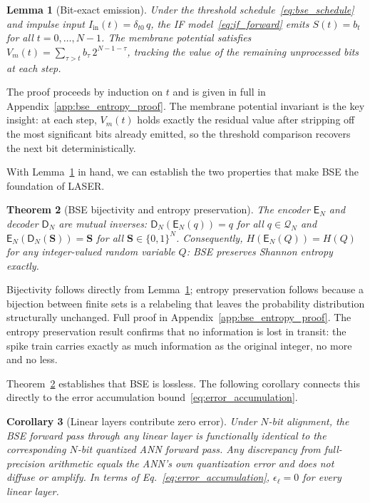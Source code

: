 \documentclass{article}
\theoremstyle{plain}
\newtheorem{theorem}{Theorem}[section]
\newtheorem{lemma}[theorem]{Lemma}
\newtheorem{corollary}[theorem]{Corollary}
\theoremstyle{definition}
\theoremstyle{remark}
\begin{document}
\begin{lemma}[Bit-exact emission]
\label{lem:bit_exact_main}
Under the threshold schedule~\eqref{eq:bse_schedule} and impulse input
$I_{\mathrm{in}}(t) = \delta_{t0}\,q$, the IF model~\eqref{eq:if_forward} emits
$S(t) = b_t$ for all $t = 0, \dots, N-1$. The membrane potential satisfies
$V_m(t) = \sum_{\tau > t} b_\tau\,2^{N-1-\tau}$, tracking the value of the
remaining unprocessed bits at each step.
\end{lemma}

The proof proceeds by induction on $t$ and is given in full in
Appendix~\ref{app:bse_entropy_proof}. The membrane potential invariant is the key
insight: at each step, $V_m(t)$ holds exactly the residual value after stripping off
the most significant bits already emitted, so the threshold comparison recovers the
next bit deterministically.

With Lemma~\ref{lem:bit_exact_main} in hand, we can establish the two properties
that make BSE the foundation of LASER.

\begin{theorem}[BSE bijectivity and entropy preservation]
\label{thm:bse_main}
The encoder $\mathsf{E}_N$ and decoder $\mathsf{D}_N$ are mutual inverses:
$\mathsf{D}_N(\mathsf{E}_N(q)) = q$ for all $q \in \mathcal{Q}_N$ and
$\mathsf{E}_N(\mathsf{D}_N(\mathbf{S})) = \mathbf{S}$ for all
$\mathbf{S} \in \{0,1\}^N$. Consequently, $H(\mathsf{E}_N(Q)) = H(Q)$ for any
integer-valued random variable $Q$: BSE preserves Shannon entropy exactly.
\end{theorem}

Bijectivity follows directly from Lemma~\ref{lem:bit_exact_main}; entropy
preservation follows because a bijection between finite sets is a relabeling that
leaves the probability distribution structurally unchanged. Full proof in
Appendix~\ref{app:bse_entropy_proof}. The entropy preservation result confirms that
no information is lost in transit: the spike train carries exactly as much
information as the original integer, no more and no less.

Theorem~\ref{thm:bse_main} establishes that BSE is lossless. The following corollary
connects this directly to the error accumulation bound~\eqref{eq:error_accumulation}.

\begin{corollary}[Linear layers contribute zero error]
\label{cor:no_diffusion_main}
Under $N$-bit alignment, the BSE forward pass through any linear layer is
functionally identical to the corresponding $N$-bit quantized ANN forward pass. Any
discrepancy from full-precision arithmetic equals the ANN's own quantization error
and does not diffuse or amplify. In terms of Eq.~\eqref{eq:error_accumulation},
$\epsilon_\ell = 0$ for every linear layer.
\end{corollary}
\end{document}
